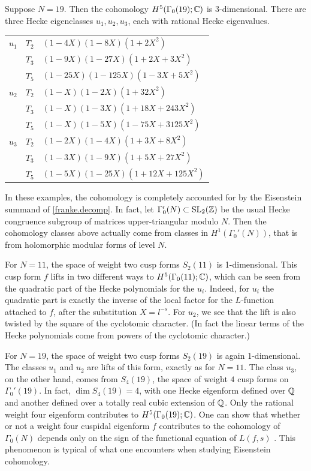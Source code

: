 \begin{example}
Suppose $N=19$.  Then the cohomology $H^{5}
(\Gamma_{0} (19); \mathbb{C})$ is 3-dimensional.  There are three Hecke
eigenclasses $u_{1}, u_{2}, u_{3}$, each with rational Hecke eigenvalues.

\medskip
\begin{center}
\begin{tabular}{|p{40pt}|p{40pt}|p{200pt}|}
\hline
$u_{1}$&$T_2$&$ (1-4 X)(1-8 X)(1  + 2 X^2)$\\
&$T_3$&$ (1-9 X)(1-27 X)(1 +2 X + 3 X^2) $\\
&$T_5$&$ (1-25 X)(1-125 X)(1 -3 X + 5 X^2) $\\
\hline
$u_{2}$&$T_2$&$ (1- X)(1-2 X)(1  + 32 X^2)$\\
&$T_3$&$ (1- X)(1-3 X)(1 +18 X + 243 X^2) $\\
&$T_5$&$ (1- X)(1-5 X)(1 -75 X + 3125 X^2) $\\
\hline
$u_{3}$&$T_2$&$ (1- 2 X)(1-4 X)(1 +3 X + 8 X^2)$\\
&$T_3$&$ (1- 3 X)(1-9 X)(1 +5 X + 27 X^2) $\\
&$T_5$&$ (1- 5 X)(1-25 X)(1 +12 X + 125 X^2) $\\
\hline
\end{tabular}
\end{center}

\end{example}

In these examples, the cohomology is completely accounted for by the
Eisenstein summand of \eqref{franke.decomp}.  In fact, let
$\Gamma'_{0} (N)\subset \operatorname{SL}_{2} (\mathbb{Z})$ be the usual Hecke congruence
subgroup of matrices upper-triangular modulo $N$.  Then the cohomology
classes above actually come from classes in $H^{1} (\Gamma_{0}' (N))$,
that is from holomorphic modular forms of level $N$.

For $N=11$, the space of weight two cusp forms $S_{2} (11)$ is
1-dimensional.  This cusp form $f$ lifts in two different ways to
$H^{5} (\Gamma_{0} (11); \mathbb{C})$, which can be seen from the quadratic
part of the Hecke polynomials for the $u_i$.  Indeed, for $u_{i}$ the
quadratic part is exactly the inverse of the local factor for the
$L$-function attached to $f$, after the substitution $X = l^{-s}$.
For $u_{2}$, we see that the lift is also twisted by the square of the
cyclotomic character.  (In fact the linear terms of the Hecke
polynomials come from powers of the cyclotomic character.)

For $N=19$, the space of weight two cusp forms $S_{2} (19)$ is again
1-dimensional.  The classes $u_{1}$ and $u_{2}$ are lifts of this
form, exactly as for $N=11$.  The class $u_{3}$, on the other hand,
comes from $S_{4} (19)$, the space of weight $4$ cusp forms on
$\Gamma_{0}' (19)$.  In fact, $\dim S_{4} (19) = 4$, with one Hecke
eigenform defined over $\mathbb{Q}$ and another defined over a totally real
cubic extension of $\mathbb{Q}$.  Only the rational weight four eigenform
contributes to $H^{5} (\Gamma_{0} (19); \mathbb{C})$.  One can show that
whether or not a weight four cuspidal eigenform $f$ contributes to the
cohomology of $\Gamma_{0} (N)$ depends only on the sign of the
functional equation of $L (f,s)$ \cite{weselman}.  This phenomenon
is typical of what one encounters when studying Eisenstein cohomology.


